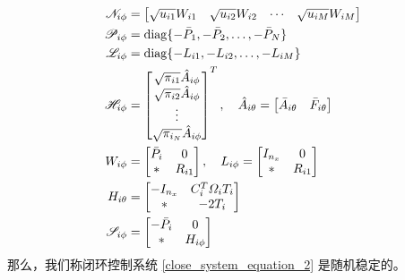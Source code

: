 	\begin{equation}\notag
	\begin{aligned}
	\mathscr{N}_{i\phi}&=\begin{bmatrix}
	\sqrt{u_{i1}}W_{i1}&\sqrt{u_{i2}}W_{i2}&\cdots&\sqrt{u_{iM}}W_{iM}
	\end{bmatrix}\\
	\mathscr{P}_{i\phi}&=\mathrm{diag} \{-\bar{P}_{1},-\bar{P}_{2},\dots,-\bar{P}_{N}  \}\\
	\mathscr{L}_{i\phi}&=\mathrm{diag} \{-L_{i1},-L_{i2},\dots,-L_{iM}  \}\\
	\mathscr{H}_{i\phi}&=\begin{bmatrix}
	\sqrt{\pi_{i1}}\hat{A}_{i\phi}\\
	\sqrt{\pi_{i2}}\hat{A}_{i\phi}\\
	\vdots\\
	\sqrt{\pi_{i_N}}\hat{A}_{i\phi}
	\end{bmatrix}^{T}, \quad
	\hat{A}_{i\theta}=\begin{bmatrix}
	\bar{A}_{i\theta}&\bar{F}_{i\theta}
	\end{bmatrix}  \\
	W_{i\phi}&=\begin{bmatrix}
	\bar{P}_{i}&0\\
	*&R_{i1}
	\end{bmatrix}, \quad
	L_{i\phi}=\begin{bmatrix}
	I_{n_x}&0\\
	*&R_{i1}
	\end{bmatrix}\\
	H_{i\theta}&=\begin{bmatrix}
	-I_{n_x}&C^{T}_{i}\varOmega_{i}T_{i} \\
	*&-2T_{i}
	\end{bmatrix}\\
	\mathscr{S}_{i\phi}&= \begin{bmatrix}
	-\bar{P}_{i}&0\\
	*&H_{i\phi}
	\end{bmatrix}\\
	\end{aligned}
	\end{equation}
	那么，我们称闭环控制系统 \eqref{close_system_equation_2} 是随机稳定的。
	
